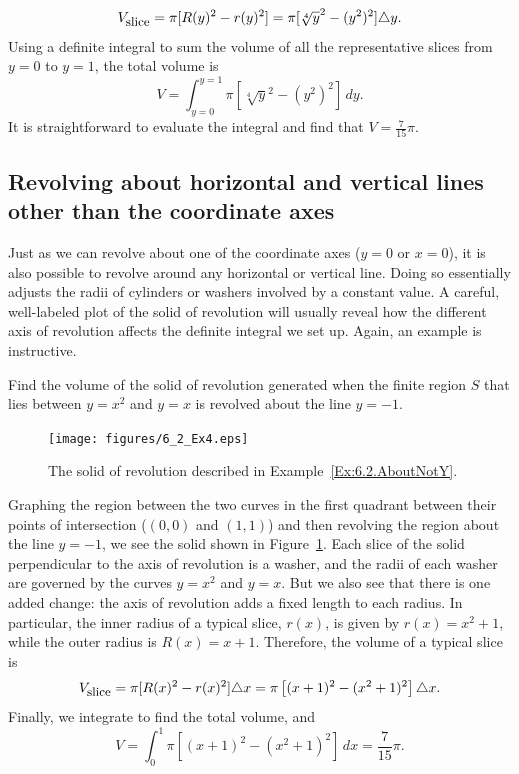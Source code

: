 $$V_{\mbox{\small{slice}}} = \pi [R(y)^2 - r(y)^2] = \pi[\sqrt[4]{y}^2 - (y^2)^2] \triangle y.$$
Using a definite integral to sum the volume of all the representative slices from $y = 0$ to $y = 1$, the total volume is
$$V = \int_{y=0}^{y=1} \pi \left[ \sqrt[4]{y}^2 - (y^2)^2 \right] \, dy.$$
It is straightforward to evaluate the integral and find that $V = \frac{7}{15} \pi$.
\afterex



\subsection*{Revolving about horizontal and vertical lines other than the coordinate axes}

Just as we can revolve about one of the coordinate axes ($y = 0$ or $x = 0$), it is also possible to revolve around any horizontal or vertical line.  Doing so essentially adjusts the radii of cylinders or washers involved by a constant value.  A careful, well-labeled plot of the solid of revolution will usually reveal how the different axis of revolution affects the definite integral we set up.  Again, an example is instructive.

\bex \label{Ex:6.2.AboutNotY}
Find the volume of the solid of revolution generated when the finite region $S$ that lies between $y = x^2$ and $y = x$ is revolved about the line $y = -1$.
\eex
\begin{figure}[h]
\begin{center}
\texttt{[image: figures/6\_2\_Ex4.eps]}
\caption{The solid of revolution described in Example~\ref{Ex:6.2.AboutNotY}.} \label{F:6.2.Ex4}
\end{center}
\end{figure}

Graphing the region between the two curves in the first quadrant between their points of intersection ($(0,0)$ and $(1,1)$) and then revolving the region about the line $y = -1$, we see the solid shown in Figure~\ref{F:6.2.Ex4}.  Each slice of the solid perpendicular to the axis of revolution is a washer, and the radii of each washer are governed by the curves $y = x^2$ and $y = x$.  But we also see that there is one added change:  the axis of revolution adds a fixed length to each radius.  In particular, the inner radius of a typical slice, $r(x)$, is given by $r(x) = x^2 + 1$, while the outer radius is $R(x) = x+1$.  Therefore, the volume of a typical slice is
$$V_{\mbox{\small{slice}}} = \pi[ R(x)^2 - r(x)^2 ] \triangle x = \pi \left[ (x+1)^2 - (x^2 + 1)^2 \right] \triangle x.$$
Finally, we integrate to find the total volume, and 
$$V = \int_0^1  \pi \left[ (x+1)^2 - (x^2 + 1)^2 \right] \, dx = \frac{7}{15} \pi.$$

